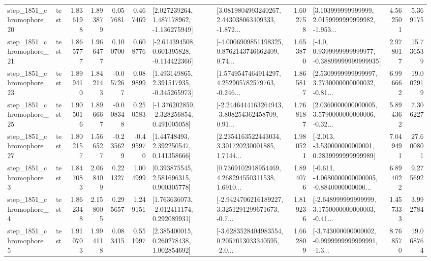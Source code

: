 \begin{tabular}{llrrrrllrlrr}
 step\_1851\_chromophore\_20 &      test &      1.836198 &    1.893879 &      0.057681 &  0.467469 &    [2.027239264, 1.487178962, -1.136275949] &  [3.0819804993240267, 2.443038063409333, -1.872... &       1.602758 &  [3.103999999999999, 2.0159999999999982, -1.953... &            4.562501 &          5.369175 \\
 step\_1851\_chromophore\_21 &      test &      1.865777 &    1.966477 &      0.100700 &  0.608776 &   [-2.614394508, 0.601395828, -0.114422366] &  [-4.0006909851198325, 0.8762143746662409, 0.74... &       1.653870 &   [-4.0, 0.9399999999999977, -0.38899999999999935] &            2.978017 &         15.736539 \\
 step\_1851\_chromophore\_23 &      test &      1.899410 &    1.842143 &     -0.057267 &  0.089899 &    [1.493149865, 2.391517935, -0.345265973] &  [1.5749547464914297, 4.252905782579763, -0.246... &       1.865817 &  [2.5309999999999997, 3.2730000000000032, -0.81... &            6.996662 &         19.002919 \\
 step\_1851\_chromophore\_25 &      test &      1.905016 &    1.896667 &     -0.008348 &  0.250583 &   [-1.376202859, -2.328256854, 0.491005058] &  [-2.2446444163264943, -3.808254362458709, 0.91... &       1.768187 &  [2.0360000000000005, 3.5790000000000006, -0.32... &            5.894362 &          7.306227 \\
 step\_1851\_chromophore\_27 &      test &      1.802157 &    1.566527 &     -0.235629 & -0.495970 &      [1.44748493, 2.392250547, 0.141358666] &  [2.2354163522443034, 3.301720230001885, 1.7144... &       1.980521 &   [-2.013, -3.530000000000001, 0.2839999999999989] &            7.049491 &         27.600801 \\
  step\_1851\_chromophore\_3 &      test &      1.847083 &    2.068409 &      0.221327 &  1.004999 &     [0.393875545, 2.581696315, 0.900305778] &  [0.7369102918954469, 4.268294550311538, 1.6910... &       1.894076 &  [-0.611, -4.0680000000000005, -0.8840000000000... &            6.894022 &          9.275692 \\
  step\_1851\_chromophore\_4 &      test &      1.862348 &    2.158005 &      0.295657 &  1.249151 &    [1.763636073, -2.012411174, 0.292089931] &  [-2.9424706216189227, 3.3251291299671673, -0.7... &       1.819236 &  [-2.648999999999999, 3.1750000000000003, -0.41... &            1.457333 &          3.992784 \\
  step\_1851\_chromophore\_5 &      test &      1.910703 &    1.994118 &      0.083415 &  0.551997 &     [2.385400015, 0.260278438, 1.002854692] &  [-3.6283528404983554, 0.2057013033340595, -2.0... &       1.662809 &  [-3.743000000000002, -0.9999999999999991, -1.3... &            8.768570 &         19.068764 \\

\end{tabular}
